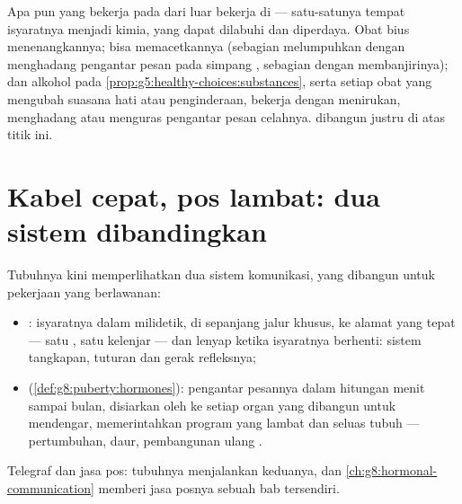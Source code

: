 \begin{remark}\label{rem:g8:nervous-communication:vulnerable}
Apa pun yang bekerja pada  dari luar bekerja di
 --- satu-satunya tempat isyaratnya menjadi
kimia, yang dapat dilabuhi dan diperdaya. Obat bius
menenangkannya; bisa  memacetkannya (sebagian
melumpuhkan dengan menghadang pengantar pesan pada simpang
, sebagian dengan membanjirinya); dan alkohol pada
\cref{prop:g5:healthy-choices:substances}, serta setiap obat
yang mengubah suasana hati atau penginderaan, bekerja dengan
menirukan, menghadang atau menguras pengantar pesan
celahnya. 
dibangun justru di atas titik ini.
\end{remark}

\section{Kabel cepat, pos lambat: dua sistem dibandingkan}

\begin{proposition}\label{prop:g8:nervous-communication:compare}
Tubuhnya kini memperlihatkan dua sistem komunikasi, yang
dibangun untuk pekerjaan yang berlawanan:
\begin{itemize}
  \item \emph{}: isyaratnya dalam milidetik, di
        sepanjang jalur khusus, ke alamat yang tepat ---
        satu , satu kelenjar --- dan lenyap ketika
        isyaratnya berhenti: sistem tangkapan, tuturan dan
        gerak refleksnya;
  \item \emph{} (\cref{def:g8:puberty:hormones}):
        pengantar pesannya dalam hitungan menit sampai
        bulan, disiarkan oleh  ke setiap organ yang
        dibangun untuk mendengar, memerintahkan program yang
        lambat dan seluas tubuh --- pertumbuhan, daur,
        pembangunan ulang .
\end{itemize}
Telegraf dan jasa pos: tubuhnya menjalankan keduanya, dan
\cref{ch:g8:hormonal-communication} memberi jasa posnya
sebuah bab tersendiri.
\end{proposition}
\admitted

